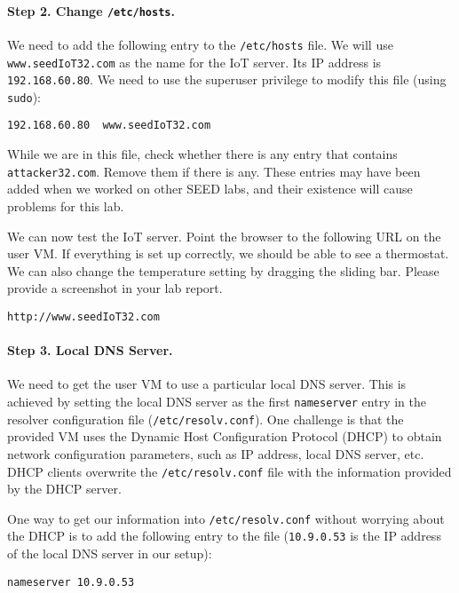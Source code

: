 \paragraph{Step 2. Change \texttt{/etc/hosts}.}
We need to add the following entry to the \texttt{/etc/hosts} file. 
We will use \texttt{www.seedIoT32.com} as the name for the 
IoT server. Its IP address is \texttt{192.168.60.80}. 
We need to use the superuser privilege to modify this file (using \texttt{sudo}): 

\begin{lstlisting}
192.168.60.80  www.seedIoT32.com
\end{lstlisting}

While we are in this file, check whether there is any entry 
that contains \texttt{attacker32.com}. Remove them if there 
is any. These entries may have been added when we worked on
other SEED labs, and their existence will cause problems for this lab. 


We can now test the IoT server. Point the browser to the following URL on the 
user VM. If everything is set up correctly, we should be able to see 
a thermostat. We can also change the temperature setting by dragging the 
sliding bar. Please provide a screenshot in your lab report. 

\begin{lstlisting}
http://www.seedIoT32.com
\end{lstlisting}
 


\paragraph{Step 3. Local DNS Server.}
We need to get the user VM to use a particular local DNS server. This is achieved by
setting the local DNS server as the first \texttt{nameserver} entry in the resolver
configuration file (\texttt{/etc/resolv.conf}). 
One challenge is that the provided VM uses the
Dynamic Host Configuration Protocol (DHCP) to obtain network configuration parameters, such as
IP address, local DNS server, etc. DHCP clients overwrite the \texttt{/etc/resolv.conf}
file with the information provided by the DHCP server.

One way to get our information into \texttt{/etc/resolv.conf} without worrying about
the DHCP is to add the following entry to the 
file (\texttt{10.9.0.53} is the IP address of the local DNS server in our setup):

\begin{lstlisting}
nameserver 10.9.0.53
\end{lstlisting}

